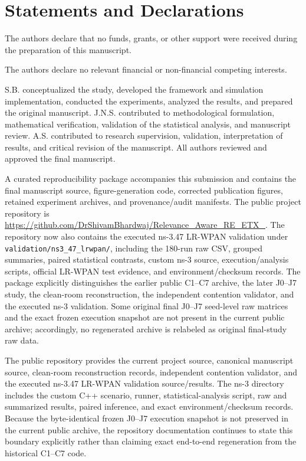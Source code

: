 \documentclass[pdflatex,sn-mathphys-num]{sn-jnl}
\begin{document}
\section*{Statements and Declarations}

The authors declare that no funds, grants, or other support were received during the preparation of this manuscript.

The authors declare no relevant financial or non-financial competing interests.

S.B. conceptualized the study, developed the framework and simulation implementation, conducted the experiments, analyzed the results, and prepared the original manuscript. J.N.S. contributed to methodological formulation, mathematical verification, validation of the statistical analysis, and manuscript review. A.S. contributed to research supervision, validation, interpretation of results, and critical revision of the manuscript. All authors reviewed and approved the final manuscript.

A curated reproducibility package accompanies this submission and contains the final manuscript source, figure-generation code, corrected publication figures, retained experiment archives, and provenance/audit manifests. The public project repository is \url{https://github.com/DrShivamBhardwaj/Relevance_Aware_RE_ETX_}. The repository now also contains the executed ns-3.47 LR-WPAN validation under \texttt{validation/ns3\_47\_lrwpan/}, including the 180-run raw CSV, grouped summaries, paired statistical contrasts, custom ns-3 source, execution/analysis scripts, official LR-WPAN test evidence, and environment/checksum records. The package explicitly distinguishes the earlier public C1--C7 archive, the later J0--J7 study, the clean-room reconstruction, the independent contention validator, and the executed ns-3 validation. Some original final J0--J7 seed-level raw matrices and the exact frozen execution snapshot are not present in the current public archive; accordingly, no regenerated archive is relabeled as original final-study raw data.

The public repository provides the current project source, canonical manuscript source, clean-room reconstruction records, independent contention validator, and the executed ns-3.47 LR-WPAN validation source/results. The ns-3 directory includes the custom C++ scenario, runner, statistical-analysis script, raw and summarized results, paired inference, and exact environment/checksum records. Because the byte-identical frozen J0--J7 execution snapshot is not preserved in the current public archive, the repository documentation continues to state this boundary explicitly rather than claiming exact end-to-end regeneration from the historical C1--C7 code.
\end{document}
